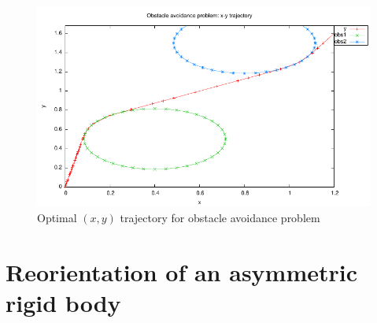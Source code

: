 \documentclass[a4paper,11pt]{report}    %
\begin{document}
\begin{figure}
  \centering 
  \includegraphics{../examples/obstacle/obstacle_xy.pdf}
  \caption{Optimal $(x,y)$ trajectory for obstacle avoidance problem}
 \label{fig:obstacle_xy}
\end{figure}



\section{Reorientation of an asymmetric rigid body}
\end{document}
